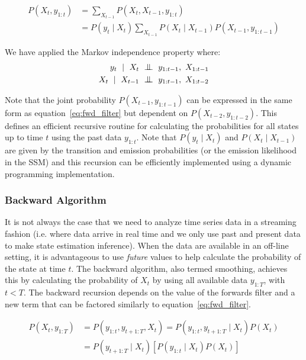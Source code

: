 \begin{equation}\label{eq:fwd_filter}
  \begin{split}
    P(X_t, y_{1:t}) &= \sum_{X_{t-1}} P(X_t, X_{t-1}, y_{1:t}) \\&= P(y_{t} \mid X_t) \sum_{X_{t-1}} P(X_t \mid X_{t-1})P(X_{t-1}, y_{1:t-1})
  \end{split}
\end{equation}

We have applied the Markov independence property where: 
\begin{equation}
	\begin{split}
	y_{t}~\mid~X_t &~\indep~y_{1:t-1},~X_{1:t-1} \\
    X_{t}~\mid~X_{t-1} &~\indep~y_{1:t-1},~X_{1:t-2}
    \end{split}
\end{equation}

Note that the joint probability $P(X_{t-1}, y_{1:t-1})$ can be expressed in the same form as equation~\ref{eq:fwd_filter} but dependent on $P(X_{t-2}, y_{1:t-2})$. This defines an efficient recursive routine for calculating the probabilities for all states up to time $t$ using the past data $y_{1:t}$. Note that $P(y_{t} \mid X_t)$ and $P(X_t \mid X_{t-1})$ are given by the transition and emission probabilities (or the emission likelihood in the SSM) and this recursion can be efficiently implemented using a dynamic programming implementation.

\subsubsection{Backward Algorithm}
It is not always the case that we need to analyze time series data in a streaming fashion (i.e. where data arrive in real time and we only use past and present data to make state estimation inference). When the data are available in an off-line setting, it is advantageous to use \textit{future} values to help calculate the probability of the state at time $t$. The backward algorithm, also termed smoothing, achieves this by calculating the probability of $X_t$ by using all available data $y_{1:T}$, with $t < T$. The backward recursion depends on the value of the forwards filter and a new term that can be factored similarly to equation~\ref{eq:fwd_filter}.

\begin{equation}\label{eq:bkwd_filter1}
  \begin{split}
    P(X_t, y_{1:T}) &= P(y_{1:t}, y_{t+1:T}, X_t) =  P(y_{1:t}, y_{t+1:T} \mid X_t)P(X_t)\\ &= P(y_{t+1:T} \mid X_t)[P(y_{1:t} \mid X_t)P(X_t)]
  \end{split}
\end{equation}

